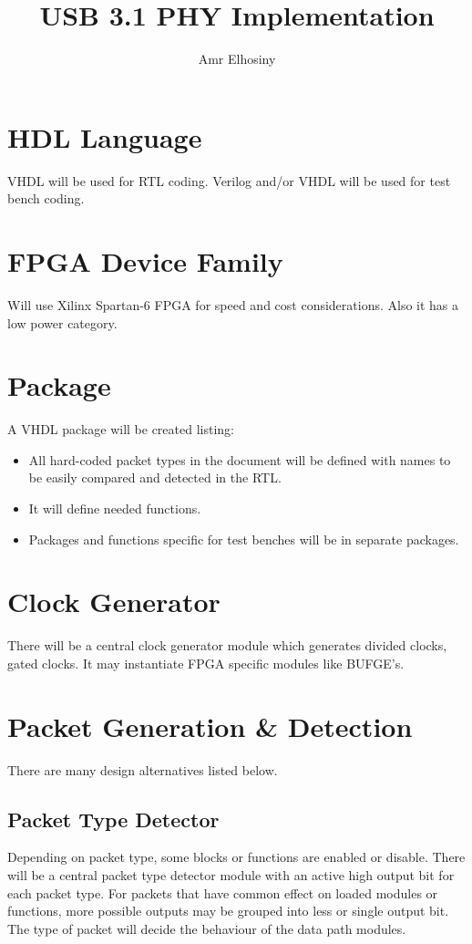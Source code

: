 \documentclass[11pt,a4paper]{article}
\author{Amr Elhosiny}
\begin{document}
\title{USB 3.1 PHY Implementation}

\maketitle

\section{HDL Language}
VHDL will be used for RTL coding. Verilog and/or VHDL will be used for test bench coding.

\section{FPGA Device Family}
Will use Xilinx Spartan-6 FPGA for speed and cost considerations. Also it has a low power category.


\section{Package}
A VHDL package will be created listing:
\begin{itemize}
	\item All hard-coded packet types in the document will be defined with names to be easily compared and detected in the RTL.
	\item It will define needed functions.
	\item Packages and functions specific for test benches will be in separate packages.
\end{itemize}

\section{Clock Generator}
There will be a central clock generator module which generates divided clocks, gated clocks. It may instantiate FPGA specific modules like BUFGE's.

\section{Packet Generation \& Detection}

There are many design alternatives listed below.

\subsection{Packet Type Detector}
Depending on packet type, some blocks or functions are enabled or disable. There will be a central packet type detector module with an active high output bit for each packet type. For packets that have common effect on loaded modules or functions, more possible outputs may be grouped into less or single output bit.
The type of packet will decide the behaviour of the data path modules.
\end{document}
